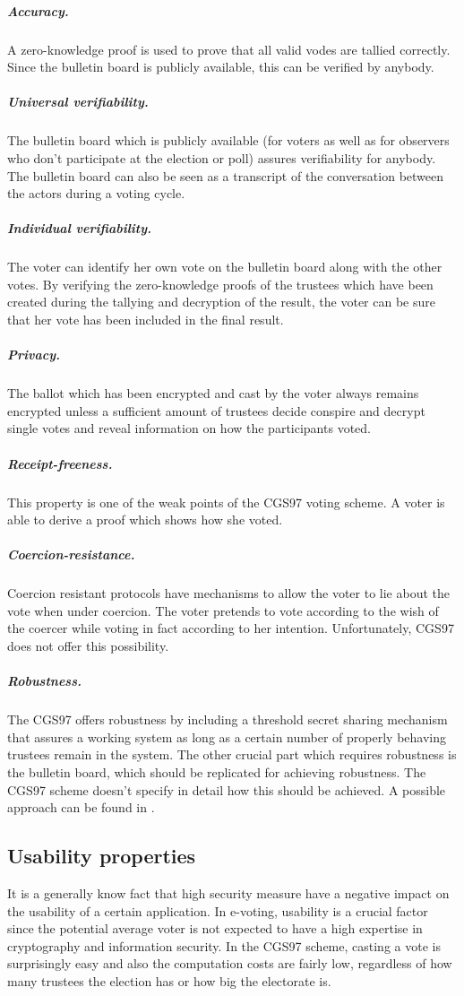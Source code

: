 \documentclass[numbers=noenddot, abstract=on, a4paper, headsepline,
footsepline, oneside, draft=off]{scrreprt}
\begin{document}
\subparagraph{Accuracy.} A zero-knowledge proof is used to prove that all valid
vodes are tallied correctly. Since the bulletin board is publicly available,
this can be verified by anybody.

\subparagraph{Universal verifiability.} The bulletin board which is publicly
available (for voters as well as for observers who don't participate at the
election or poll) assures verifiability for anybody. The bulletin board can also
be seen as a transcript of the conversation between the actors during a voting
cycle. 

\subparagraph{Individual verifiability.} The voter can identify her own vote on
the bulletin board along with the other votes. By verifying the zero-knowledge
proofs of the trustees which have been created during the tallying and
decryption of the result, the voter can be sure that her vote has been included
in the final result.

\subparagraph{Privacy.} The ballot which has been encrypted and cast by the
voter always remains encrypted unless a sufficient amount of trustees decide
conspire and decrypt single votes and reveal information on how the participants
voted.

\subparagraph{Receipt-freeness.} This property is one of the weak points of the
CGS97 voting scheme. A voter is able to derive a proof which shows how she
voted.

\subparagraph{Coercion-resistance.} Coercion resistant protocols have mechanisms
to allow the voter to lie about the vote when under coercion. The voter pretends
to vote according to the wish of the coercer while voting in fact according to
her intention. Unfortunately, CGS97 does not offer this possibility.

\subparagraph{Robustness.} The CGS97 offers robustness by including a
threshold secret sharing mechanism that assures a working system as long as a
certain number of properly behaving trustees remain in the system. The other
crucial part which requires robustness is the bulletin board, which should be
replicated for achieving robustness. The CGS97 scheme doesn't specify in detail
how this should be achieved. A possible approach can be found in \cite{HL09}.

\subsection{Usability properties}
\label{sec:usabilityproperties}
It is a generally know fact that high security measure have a negative impact on
the usability of a certain application. In e-voting, usability is a crucial
factor since the potential average voter is not expected to have a high
expertise in cryptography and information security. In the CGS97 scheme, casting
a vote is surprisingly easy and also the computation costs are fairly low,
regardless of how many trustees the election has or how big the electorate is.
\end{document}
